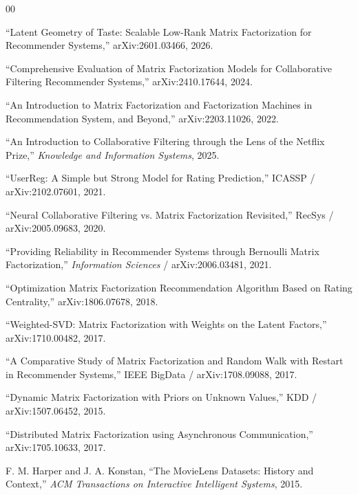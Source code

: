 \documentclass[conference]{IEEEtran}
\begin{document}
\begin{thebibliography}{00}

 ``Latent Geometry of Taste: Scalable Low-Rank Matrix Factorization for Recommender Systems,'' arXiv:2601.03466, 2026.

 ``Comprehensive Evaluation of Matrix Factorization Models for Collaborative Filtering Recommender Systems,'' arXiv:2410.17644, 2024.

 ``An Introduction to Matrix Factorization and Factorization Machines in Recommendation System, and Beyond,'' arXiv:2203.11026, 2022.

 ``An Introduction to Collaborative Filtering through the Lens of the Netflix Prize,'' \textit{Knowledge and Information Systems}, 2025.

 ``UserReg: A Simple but Strong Model for Rating Prediction,'' ICASSP / arXiv:2102.07601, 2021.

 ``Neural Collaborative Filtering vs. Matrix Factorization Revisited,'' RecSys / arXiv:2005.09683, 2020.

 ``Providing Reliability in Recommender Systems through Bernoulli Matrix Factorization,'' \textit{Information Sciences} / arXiv:2006.03481, 2021.

 ``Optimization Matrix Factorization Recommendation Algorithm Based on Rating Centrality,'' arXiv:1806.07678, 2018.

 ``Weighted-SVD: Matrix Factorization with Weights on the Latent Factors,'' arXiv:1710.00482, 2017.

 ``A Comparative Study of Matrix Factorization and Random Walk with Restart in Recommender Systems,'' IEEE BigData / arXiv:1708.09088, 2017.

 ``Dynamic Matrix Factorization with Priors on Unknown Values,'' KDD / arXiv:1507.06452, 2015.

 ``Distributed Matrix Factorization using Asynchronous Communication,'' arXiv:1705.10633, 2017.

 F. M. Harper and J. A. Konstan, ``The MovieLens Datasets: History and Context,'' \textit{ACM Transactions on Interactive Intelligent Systems}, 2015.

\end{thebibliography}
\end{document}
